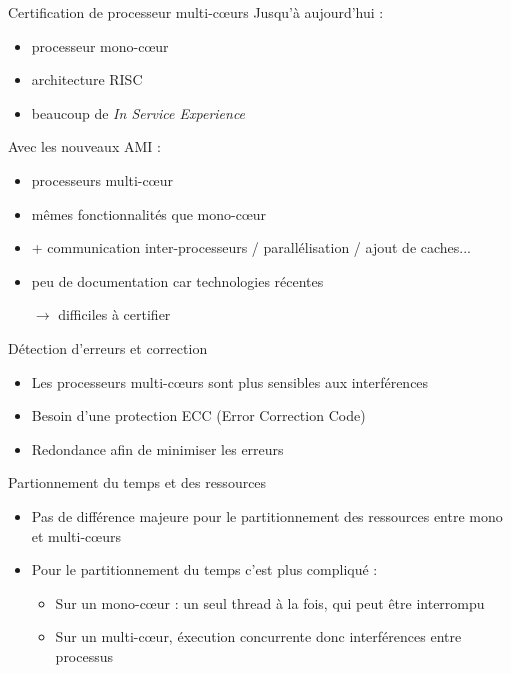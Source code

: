 \documentclass{beamer}
\begin{document}
\begin{frame}{Certification de processeur multi-cœurs}
	Jusqu'à aujourd'hui :
	\begin{itemize}
		\item processeur mono-cœur
		\item architecture RISC
		\item beaucoup de \textit{In Service Experience}
	\end{itemize}
	\pause
	Avec les nouveaux AMI :
	\begin{itemize}
		\item processeurs multi-cœur
		\item mêmes fonctionnalités que mono-cœur
		\item + communication inter-processeurs / parallélisation / ajout de caches...
		\item peu de documentation car technologies récentes
		\item[$\rightarrow$] difficiles à certifier
	\end{itemize}
\end{frame}

\begin{frame}{Détection d'erreurs et correction}
	\begin{itemize}
		\item Les processeurs multi-cœurs sont plus sensibles aux interférences\pause
		\item Besoin d'une protection ECC (Error Correction Code)\pause
		\item Redondance afin de minimiser les erreurs
	\end{itemize}
\end{frame}

\begin{frame}{Partionnement du temps et des ressources}
	\begin{itemize}
		\item Pas de différence majeure pour le partitionnement des ressources entre mono
			et multi-cœurs\pause
		\item Pour le partitionnement du temps c'est plus compliqué :
			\begin{itemize}
				\item Sur un mono-cœur : un seul thread à la fois, qui peut être
					interrompu
				\item Sur un multi-cœur, éxecution concurrente donc interférences entre
					processus
			\end{itemize}
	\end{itemize}
\end{frame}
\end{document}
